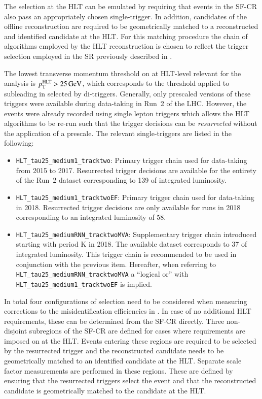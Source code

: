 The selection at the HLT can be emulated by requiring that events in
the SF-CR also pass an appropriately chosen single-\tauhadvis trigger.
In addition, \tauhadvis candidates of the offline \tauhadvis
reconstruction are required to be geometrically matched to a
reconstructed and identified \tauhadvis candidate at the HLT. For this
matching procedure the chain of algorithms employed by the HLT
\tauhadvis reconstruction is chosen to reflect the trigger selection
employed in the \hadhad SR previously described in
.

The lowest transverse momentum threshold on \tauhadvis at HLT-level
relevant for the analysis is $p_{\text{T}}^{\text{HLT}} > \SI{25}{\ensuremath{\text{GeV}}}$, which
corresponds to the threshold applied to \tauhadvis subleading in \pT
selected by di-\tauhadvis triggers. Generally, only prescaled versions
of these triggers were available during data-taking in Run~2 of the
LHC. However, the events were already recorded using single lepton
triggers which allows the HLT algorithms to be re-run such that the
trigger decisions can be \textit{resurrected} without the application
of a prescale. The relevant single-\tauhadvis triggers are listed in
the following:%
\begin{itemize}
\item \verb|HLT_tau25_medium1_tracktwo|: Primary trigger chain used
  for data-taking from 2015 to 2017. Resurrected trigger decisions are
  available for the entirety of the Run~2 dataset corresponding to
  \SI{139}{\ifb} of integrated luminosity.

\item \verb|HLT_tau25_medium1_tracktwoEF|: Primary trigger chain used
  for data-taking in 2018. Resurrected trigger decisions are only
  available for runs in 2018 corresponding to an integrated luminosity
  of \SI{58}{\ifb}.

\item \verb|HLT_tau25_mediumRNN_tracktwoMVA|: Supplementary trigger
  chain introduced starting with period K in 2018. The available
  dataset corresponds to \SI{37}{\ifb} of integrated luminosity.  This
  trigger chain is recommended to be used in conjunction with the
  previous item. Hereafter, when referring to
  \verb|HLT_tau25_mediumRNN_tracktwoMVA| a ``logical or'' with
  \verb|HLT_tau25_medium1_tracktwoEF| is implied.
\end{itemize}

In total four configurations of \tauhadvis selection need to be
considered when measuring corrections to the \jettotauhadvis
misidentification efficiencies in \ttbar. In case of no additional HLT
requirements, these can be determined from the SF-CR directly. Three
non-disjoint subregions of the SF-CR are defined for cases where
requirements are imposed on \tauhadvis at the HLT. Events entering
these regions are required to be selected by the resurrected trigger
and the reconstructed \tauhadvis candidate needs to be geometrically
matched to an identified \tauhadvis candidate at the HLT. Separate
scale factor measurements are performed in these regions. These are defined
by ensuring that the resurrected triggers select the event and that
the reconstructed \tauhadvis candidate is geometrically matched to the
\tauhadvis candidate at the HLT.

